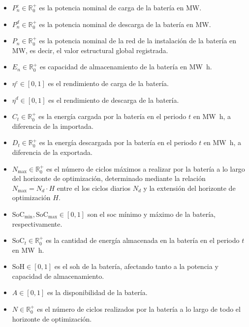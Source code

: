 \begin{itemize}

  \item \( P^{c}_{n} \in \mathbb{R}^{+}_{0} \) es la potencia nominal de carga de la batería en \si{\mega\watt}.

  \item \( P^{d}_{n} \in \mathbb{R}^{+}_{0} \) es la potencia nominal de descarga de la batería en \si{\mega\watt}.

  \item \( P_{n} \in \mathbb{R}^{+}_{0} \) es la potencia nominal de la red de la instalación de la batería en \si{\mega\watt}, es decir, el valor estructural global registrada.

  \item \( E_{n} \in \mathbb{R}^{+}_{0} \) es capacidad de almacenamiento de la batería en \si{{\mega\watt\hour}}.

  \item \( \eta^{c} \in [0, 1] \) es el rendimiento de carga de la batería.

  \item \( \eta^{d} \in [0, 1] \) es el rendimiento de descarga de la batería.

  \item \( C_{t} \in \mathbb{R}^{+}_{0} \) es la energía cargada por la batería en el periodo \( t \) en \si{{\mega\watt\hour}}, a diferencia de la importada.

  \item \( D_{t} \in \mathbb{R}^{+}_{0} \) es la energía descargada por la batería en el periodo \( t \) en \si{{\mega\watt\hour}}, a diferencia de la exportada.

  \item \( N_{\text{max}} \in \mathbb{R}^{+}_{0} \) es el número de ciclos máximos a realizar por la batería a lo largo del horizonte de optimización, determinado mediante la relación \( N_{\text{max}} = N_{d} \cdot H \) entre el los ciclos diarios \( N_{d} \) y la extensión del horizonte de optimización \( H \).

  \item \( \text{SoC}_{\text{min}}, \text{SoC}_{\text{max}} \in [0, 1] \) son el \gls{soc} mínimo y máximo de la batería, respectivamente.

  \item \( \text{SoC}_{t} \in \mathbb{R}^{+}_{0} \) es la cantidad de energía almacenada en la batería en el periodo \( t \) en \si{{\mega\watt\hour}}.

  \item \( \text{SoH} \in [0, 1] \) es el \gls{soh} de la batería, afectando tanto a la potencia y capacidad de almacenamiento.

  \item \( A \in [0, 1] \) es la disponibilidad de la batería.

  \item \( N \in \mathbb{R}^{+}_{0} \) es el número de ciclos realizados por la batería a lo largo de todo el horizonte de optimización.

\end{itemize}

